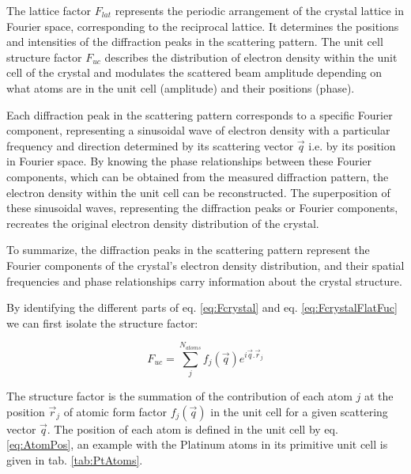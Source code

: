 The lattice factor $F_{lat}$ represents the periodic arrangement of the crystal lattice in Fourier space, corresponding to the reciprocal lattice.
It determines the positions and intensities of the diffraction peaks in the scattering pattern.
The unit cell structure factor $F_{uc}$ describes the distribution of electron density within the unit cell of the crystal and modulates the scattered beam amplitude depending on what atoms are in the unit cell (amplitude) and their positions (phase).

Each diffraction peak in the scattering pattern corresponds to a specific Fourier component, representing a sinusoidal wave of electron density with a particular frequency and direction determined by its scattering vector $\vec{q}$ i.e. by its position in Fourier space.
By knowing the phase relationships between these Fourier components, which can be obtained from the measured diffraction pattern, the electron density within the unit cell can be reconstructed.
The superposition of these sinusoidal waves, representing the diffraction peaks or Fourier components, recreates the original electron density distribution of the crystal.

To summarize, the diffraction peaks in the scattering pattern represent the Fourier components of the crystal's electron density distribution, and their spatial frequencies and phase relationships carry information about the crystal structure.

By identifying the different parts of eq. \ref{eq:Fcrystal} and eq. \ref{eq:FcrystalFlatFuc} we can first isolate the structure factor:

\begin{equation}
    \label{eq:StrucFactor}
    F_{uc} = \sum_j^{N_{atoms}} f_j(\vec{q}) e^{i\vec{q}.\vec{r}_j}
\end{equation}

The structure factor is the summation of the contribution of each atom $j$ at the position $\vec{r}_j$ of atomic form factor $f_j(\vec{q})$ in the unit cell for a given scattering vector $\vec{q}$.
The position of each atom is defined in the unit cell by eq. \ref{eq:AtomPos}, an example with the Platinum atoms in its primitive unit cell is given in tab. \ref{tab:PtAtoms}.

